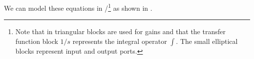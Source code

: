We can model these equations in \Matlab{}/\Simulink{}\footnote{Note
  that in \Simulink{} triangular blocks are used for gains and that the transfer function
  block $1/s$ represents the integral operator $\int$. The small
  elliptical blocks represent input and output ports.} as shown in .
\begin{slide}\label{slides:l13s1a}
\end{slide}
